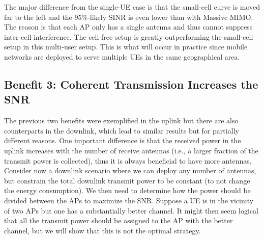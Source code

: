 The major difference from the single-\gls{UE} case is that the small-cell curve is moved far to the left and the 95\%-likely \gls{SINR} is even lower than with Massive \gls{MIMO}. The reason is that each \gls{AP} only has a single antenna and thus cannot suppress inter-cell interference. The cell-free setup is greatly outperforming the small-cell setup in this multi-user setup. This is what will occur in practice since mobile networks are deployed to serve multiple \glspl{UE} in the same geographical area.



\subsection{Benefit 3: Coherent Transmission Increases the \gls{SNR}}

The previous two benefits were exemplified in the uplink but there are also counterparts in the downlink, which lead to similar results but for partially different reasons. One important difference is that the received power in the uplink increases with the number of receive antennas (i.e., a larger fraction of the transmit power is collected), thus it is always beneficial to have more antennas. Consider now a downlink scenario where we can deploy any number of antennas, but constrain the total downlink transmit power to be constant (to not change the energy consumption). We then need to determine how the power should be divided between the \glspl{AP} to maximize the \gls{SNR}.
Suppose a \gls{UE} is in the vicinity of two \glspl{AP} but one has a substantially better channel. It might then seem logical that all the transmit power should be assigned to the \gls{AP} with the better channel, but we will show that this is not the optimal strategy.

